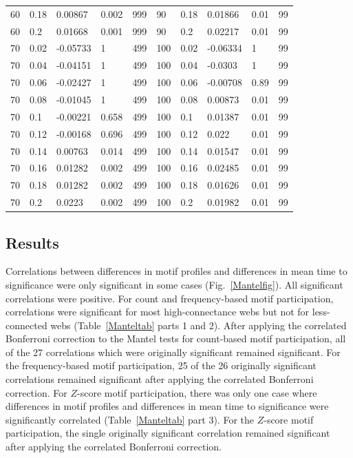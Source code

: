 \documentclass[12pt]{article}
\begin{document}
\begin{spacing}{2.0}
\begin{table}[hb!]
\begin{tabular}{l l | l l | l || ll | ll | l}
            60	&	0.18	&	0.00867	&	0.002	&	999	&	90	&	0.18	&	0.01866	&	0.01	&	99	\\
            60	&	0.2	&	0.01668	&	0.001	&	999	&	90	&	0.2	&	0.02217	&	0.01	&	99	\\
            70	&	0.02	&	-0.05733	&	1	&	499	&	100	&	0.02	&	-0.06334	&	1	&	99	\\
            70	&	0.04	&	-0.04151	&	1	&	499	&	100	&	0.04	&	-0.0303	&	1	&	99	\\
            70	&	0.06	&	-0.02427	&	1	&	499	&	100	&	0.06	&	-0.00708	&	0.89	&	99	\\
            70	&	0.08	&	-0.01045	&	1	&	499	&	100	&	0.08	&	0.00873	&	0.01	&	99	\\
            70	&	0.1	&	-0.00221	&	0.658	&	499	&	100	&	0.1	&	0.01387	&	0.01	&	99	\\
            70	&	0.12	&	-0.00168	&	0.696	&	499	&	100	&	0.12	&	0.022	&	0.01	&	99	\\
            70	&	0.14	&	0.00763	&	0.014	&	499	&	100	&	0.14	&	0.01547	&	0.01	&	99	\\
            70	&	0.16	&	0.01282	&	0.002	&	499	&	100	&	0.16	&	0.02485	&	0.01	&	99	\\
            70	&	0.18	&	0.01282	&	0.002	&	499	&	100	&	0.18	&	0.01626	&	0.01	&	99	\\
            70	&	0.2	&	0.0223	&	0.002	&	499	&	100	&	0.2	&	0.01982	&	0.01	&	99	\\
			\end{tabular}			
			\end{table}
			

	\subsection*{Results}

        Correlations between differences in motif profiles and differences in mean time to significance were only significant in some cases (Fig.~\ref{Mantelfig}).
        All significant correlations were positive.
        For count and frequency-based motif participation, correlations were significant for most high-connectance webs but not for less-connected webs (Table~\ref{Manteltab} parts 1 and 2).
        After applying the correlated Bonferroni correction to the Mantel tests for count-based motif participation, all of the 27 correlations which were originally significant remained significant. 
        For the frequency-based motif participation, 25 of the 26 originally significant correlations remained significant after applying the correlated Bonferroni correction.
        For $Z$-score motif participation, there was only one case where differences in motif profiles and differences in mean time to significance were significantly correlated (Table~\ref{Manteltab} part 3).
        For the $Z$-score motif participation, the single originally significant correlation remained significant after applying the correlated Bonferroni correction.
        



\end{spacing}
\end{document}
